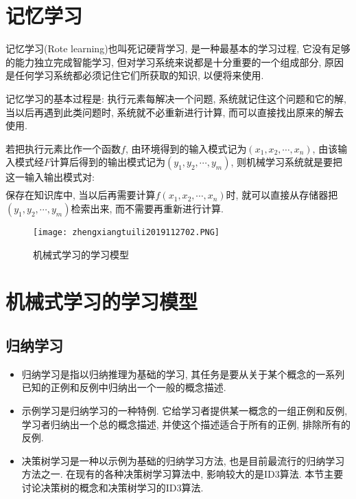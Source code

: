 \section{记忆学习}

记忆学习(Rote learning)也叫死记硬背学习, 是一种最基本的学习过程, 它没有足够的能力独立完成智能学习, 但对学习系统来说都是十分重要的一个组成部分, 原因是任何学习系统都必须记住它们所获取的知识, 以便将来使用.

记忆学习的基本过程是: 执行元素每解决一个问题, 系统就记住这个问题和它的解, 当以后再遇到此类问题时, 系统就不必重新进行计算, 而可以直接找出原来的解去使用.

若把执行元素比作一个函数$f$, 由环境得到的输入模式记为$(x_1,x_2,\cdots ,x_n)$, 由该输入模式经$F$计算后得到的输出模式记为$(y_1,y_2,\cdots ,y_m)$, 则机械学习系统就是要把这一输入输出模式对:
\begin{align}
  [(x_1,x_2,\cdots ,x_n) , (y_1,y_2,\cdots ,y_m)]
\end{align}
保存在知识库中, 当以后再需要计算$f(x_1,x_2,\cdots ,x_n)$时, 就可以直接从存储器把$(y_1,y_2,\cdots ,y_m)$检索出来, 而不需要再重新进行计算.
\begin{figure}[H]
\centering
\texttt{[image: zhengxiangtuili2019112702.PNG]}
\caption{机械式学习的学习模型}
\label{AI32fig2702}
\end{figure}
\section{机械式学习的学习模型}
\subsection{归纳学习}
\begin{itemize}
\item 归纳学习是指以归纳推理为基础的学习, 其任务是要从关于某个概念的一系列已知的正例和反例中归纳出一个一般的概念描述.
\item 示例学习是归纳学习的一种特例. 它给学习者提供某一概念的一组正例和反例, 学习者归纳出一个总的概念描述, 并使这个描述适合于所有的正例, 排除所有的反例.
\item 决策树学习是一种以示例为基础的归纳学习方法, 也是目前最流行的归纳学习方法之一. 在现有的各种决策树学习算法中, 影响较大的是ID3算法. 本节主要讨论决策树的概念和决策树学习的ID3算法.
\end{itemize}
